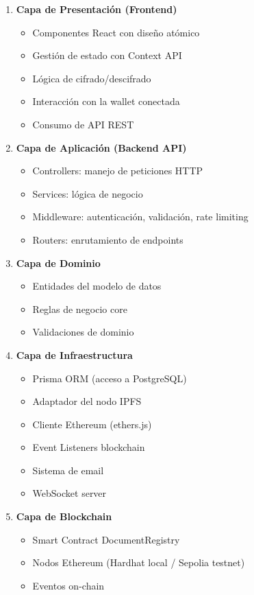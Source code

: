 \documentclass[11pt, a4paper]{article}
\begin{document}
\begin{enumerate}
    \item \textbf{Capa de Presentación (Frontend)}
    \begin{itemize}
        \item Componentes React con diseño atómico
        \item Gestión de estado con Context API
        \item Lógica de cifrado/descifrado
        \item Interacción con la wallet conectada
        \item Consumo de API REST
    \end{itemize}
    
    \item \textbf{Capa de Aplicación (Backend API)}
    \begin{itemize}
        \item Controllers: manejo de peticiones HTTP
        \item Services: lógica de negocio
        \item Middleware: autenticación, validación, rate limiting
        \item Routers: enrutamiento de endpoints
    \end{itemize}
    
    \item \textbf{Capa de Dominio}
    \begin{itemize}
        \item Entidades del modelo de datos
        \item Reglas de negocio core
        \item Validaciones de dominio
    \end{itemize}
    
    \item \textbf{Capa de Infraestructura}
    \begin{itemize}
        \item Prisma ORM (acceso a PostgreSQL)
        \item Adaptador del nodo IPFS
        \item Cliente Ethereum (ethers.js)
        \item Event Listeners blockchain
        \item Sistema de email
        \item WebSocket server
    \end{itemize}
    
    \item \textbf{Capa de Blockchain}
    \begin{itemize}
        \item Smart Contract DocumentRegistry
        \item Nodos Ethereum (Hardhat local / Sepolia testnet)
        \item Eventos on-chain
    \end{itemize}
    

\end{enumerate}
\end{document}
